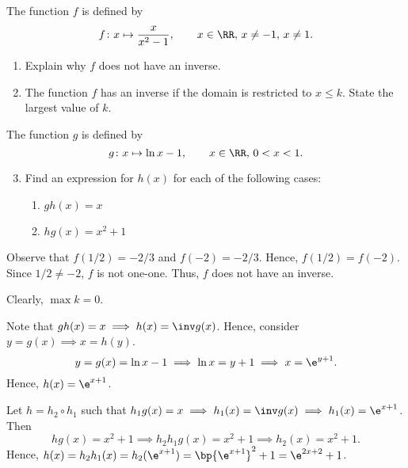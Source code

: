 \begin{problem}
    The function $f$ is defined by \[f \colon x \mapsto \frac{x}{x^2 - 1}, \qquad x \in \RR, \, x \neq -1, \, x \neq 1.\]

    \begin{enumerate}
        \item Explain why $f$ does not have an inverse.
        \item The function $f$ has an inverse if the domain is restricted to $x \leq k$. State the largest value of $k$.
    \end{enumerate}

    The function $g$ is defined by \[g \colon x \mapsto \ln x - 1, \qquad x \in \RR, \, 0 < x < 1.\]

    \begin{enumerate}
        \setcounter{enumi}{2}
        \item Find an expression for $h(x)$ for each of the following cases:
        \begin{enumerate}
            \item $gh(x) = x$
            \item $hg(x) = x^2+1$
        \end{enumerate}
    \end{enumerate}
\end{problem}
\begin{solution}
    \begin{ppart}
        Observe that $f(1/2) = -2/3$ and $f(-2) = -2/3$. Hence, $f(1/2) = f(-2)$. Since $1/2 \neq -2$, $f$ is not one-one. Thus, $f$ does not have an inverse.
    \end{ppart}
    \begin{ppart}
        Clearly, $\max k = 0$.
    \end{ppart}
    \begin{ppart}
        \begin{psubpart}
            Note that $gh(x) = x \implies h(x) = \inv g(x)$. Hence, consider $y = g(x) \implies x = h(y)$. \[y = g(x) = \ln x - 1 \implies \ln x = y+1 \implies x = \e^{y+1}.\] Hence, $h(x) = \e^{x+1}$.
        \end{psubpart}
        \begin{psubpart}
            Let $h = h_2 \circ h_1$ such that $h_1g(x) = x \implies h_1(x) = \inv g(x) \implies h_1(x) = \e^{x+1}$. Then \[hg(x) = x^2+1 \implies h_2h_1g(x) = x^2+1 \implies h_2(x) = x^2+1.\] Hence, $h(x) = h_2h_1(x) = h_2(\e^{x+1}) = \bp{\e^{x+1}}^2 + 1 = \e^{2x+2} + 1$.
        \end{psubpart}
    \end{ppart}
\end{solution}